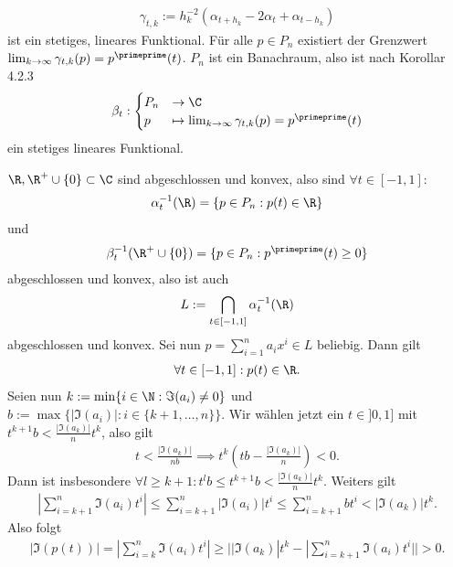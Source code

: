 \begin{solution}
\begin{itemize}
\begin{align*}
    \gamma_{t,k} := h_k^{-2}(\alpha_{t + h_k} - 2\alpha_t + \alpha_{t - h_k})
  \end{align*}
  ist ein stetiges, lineares Funktional.
  Für alle $p \in P_n$ existiert der Grenzwert $\lim_{k \to \infty}\gamma_{t,k}(p) = p^{\primeprime}(t)$.
  $P_n$ ist ein Banachraum, also ist nach Korollar 4.2.3
  \begin{align*}
    \beta_t: \begin{cases}
      P_n &\to \C \\
      p &\mapsto \lim_{k \to \infty}\gamma_{t,k}(p) = p^{\primeprime}(t)
    \end{cases}
  \end{align*}
  ein stetiges lineares Funktional.
\end{itemize}
$\R, \R^+ \cup \{0\} \subset \C$ sind abgeschlossen und konvex, also sind $\forall t \in [-1,1]$:
\begin{align*}
  \alpha_t^{-1}(\R) = \{p \in P_n: p(t) \in \R\}
\end{align*}
und
\begin{align*}
  \beta_t^{-1}(\R^+ \cup \{0\}) = \{p \in P_n: p^{\primeprime}(t) \geq 0\}
\end{align*}
abgeschlossen und konvex, also ist auch
\begin{align*}
  L := \bigcap_{t \in [-1,1]}\alpha_t^{-1}(\R)
\end{align*}
abgeschlossen und konvex. Sei nun $p = \sum_{i = 1}^n a_i x^i \in L$ beliebig.
Dann gilt
\begin{align*}
  \forall t \in [-1,1]: p(t) \in \R.
\end{align*}
Seien nun $k := \min \{ i \in \N: \Im(a_i) \neq 0\}$
und $b := \max\{|\Im(a_i)|: i \in \{k+1,\dots,n\}\}$.
Wir wählen jetzt ein $t \in ]0,1]$ mit $t^{k+1}b < \frac{|\Im(a_k)|}{n}t^k$,
also gilt
\begin{align*}
  t < \frac{|\Im(a_k)|}{nb} \implies t^k(tb - \frac{|\Im(a_k)|}{n}) < 0.
\end{align*}
Dann ist insbesondere $\forall l \geq k + 1: t^lb \leq t^{k+1}b < \frac{|\Im(a_k)|}{n}t^k$.
Weiters gilt
\begin{align*}
  |\sum_{i = k + 1}^n \Im(a_i)t^i| \leq \sum_{i = k + 1}^n|\Im(a_i)|t^i
  \leq \sum_{i = k + 1}^n b t^i < |\Im(a_k)|t^k.
\end{align*}
Also folgt
\begin{align*}
  |\Im(p(t))| = |\sum_{i = k}^n \Im(a_i)t^i| \geq | |\Im(a_k)|t^k - |\sum_{i = k + 1}^n \Im(a_i)t^i|| > 0.
\end{align*}

\end{solution}
